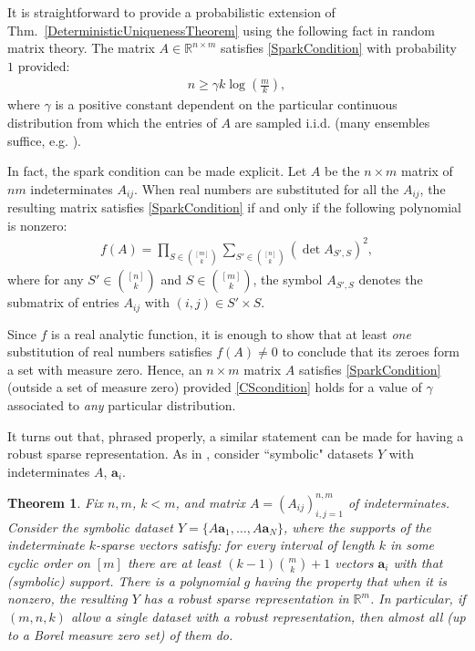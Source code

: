 \documentclass[journal, twocolumn]{IEEEtran}
\newtheorem{theorem}{Theorem}
\begin{document}
It is straightforward to provide a probabilistic extension of Thm.~\ref{DeterministicUniquenessTheorem} using the following fact in random matrix theory.  The matrix $A \in \mathbb{R}^{n \times m}$ satisfies \eqref{SparkCondition} with probability $1$
provided:
\begin{align}\label{CScondition}
n \geq \gamma k\log\left(\frac{m}{k}\right),
\end{align}
where $\gamma$ is a positive constant dependent on the particular continuous distribution from which the entries of $A$ are sampled i.i.d. (many ensembles suffice, e.g. \cite[Sec.~4]{Baraniuk08}). 

In fact, the spark condition can be made explicit.  Let $A$  be the $n \times m$ matrix of $nm$ indeterminates $A_{ij}$. When real numbers are substituted for all the $A_{ij}$, the resulting matrix satisfies \eqref{SparkCondition} if and only if the following polynomial is nonzero:
\begin{align*}
f(A) = \prod_{S \in {[m] \choose k}} \sum_{S' \in {[n] \choose k}} (\det A_{S',S})^2,
\end{align*}
%
where for any $S' \in {[n] \choose k}$ and $S \in {[m] \choose k}$, the symbol $A_{S',S}$ denotes the submatrix of entries $A_{ij}$ with $(i,j) \in S' \times S$. 

Since $f$ is a real analytic function, it is enough to show that at least \emph{one} substitution of real numbers satisfies $f(A) \neq 0$ to conclude that its zeroes form a set with measure zero. Hence, an $n \times m$ matrix $A$ satisfies \eqref{SparkCondition} (outside a set of measure zero) provided \eqref{CScondition} holds for a value of $\gamma$ associated to \emph{any} particular distribution. 

It turns out that, phrased properly, a similar statement can be made for having a robust sparse representation.  
As in \cite{Hillar15}, consider ``symbolic" datasets $Y$ with indeterminates $A$, $\mathbf{a}_i$.
\begin{theorem}\label{robustPolythm}
Fix $n, m$, $k < m$, and matrix $A = (A_{ij})_{i,j=1}^{n,m}$ of indeterminates. 
Consider the symbolic dataset $Y = \{A\mathbf{a}_1,\ldots,A \mathbf{a}_N\}$, where the supports of the indeterminate $k$-sparse vectors satisfy: 
for every interval of length $k$ in some cyclic order on $[m]$ there are at least \mbox{$(k-1){m \choose k}+1$} vectors $\mathbf{a}_i$ with that (symbolic) support. There is a polynomial $g$ having the property that when it is nonzero, the resulting $Y$ has a robust sparse representation in $\mathbb R^m$.
In particular, if $(m,n,k)$ allow a single dataset with a robust representation, then almost all (up to a Borel measure zero set) of them do.
\end{theorem}
\end{document}
